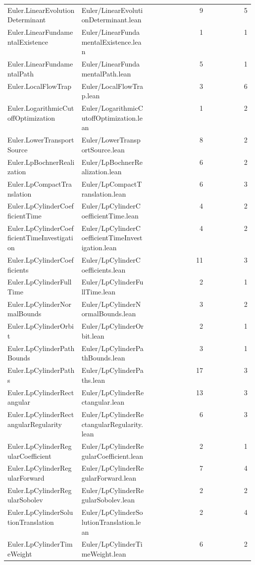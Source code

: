 \begin{longtable}{p{0.30\linewidth}p{0.28\linewidth}rr}
Euler.LinearEvolutionDeterminant & Euler/LinearEvolutionDeterminant.lean & 9 & 5\\
Euler.LinearFundamentalExistence & Euler/LinearFundamentalExistence.lean & 1 & 1\\
Euler.LinearFundamentalPath & Euler/LinearFundamentalPath.lean & 5 & 1\\
Euler.LocalFlowTrap & Euler/LocalFlowTrap.lean & 3 & 6\\
Euler.LogarithmicCutoffOptimization & Euler/LogarithmicCutoffOptimization.lean & 1 & 2\\
Euler.LowerTransportSource & Euler/LowerTransportSource.lean & 8 & 2\\
Euler.LpBochnerRealization & Euler/LpBochnerRealization.lean & 6 & 2\\
Euler.LpCompactTranslation & Euler/LpCompactTranslation.lean & 6 & 3\\
Euler.LpCylinderCoefficientTime & Euler/LpCylinderCoefficientTime.lean & 4 & 2\\
Euler.LpCylinderCoefficientTimeInvestigation & Euler/LpCylinderCoefficientTimeInvestigation.lean & 4 & 2\\
Euler.LpCylinderCoefficients & Euler/LpCylinderCoefficients.lean & 11 & 3\\
Euler.LpCylinderFullTime & Euler/LpCylinderFullTime.lean & 2 & 1\\
Euler.LpCylinderNormalBounds & Euler/LpCylinderNormalBounds.lean & 3 & 2\\
Euler.LpCylinderOrbit & Euler/LpCylinderOrbit.lean & 2 & 1\\
Euler.LpCylinderPathBounds & Euler/LpCylinderPathBounds.lean & 3 & 1\\
Euler.LpCylinderPaths & Euler/LpCylinderPaths.lean & 17 & 3\\
Euler.LpCylinderRectangular & Euler/LpCylinderRectangular.lean & 13 & 3\\
Euler.LpCylinderRectangularRegularity & Euler/LpCylinderRectangularRegularity.lean & 6 & 3\\
Euler.LpCylinderRegularCoefficient & Euler/LpCylinderRegularCoefficient.lean & 2 & 1\\
Euler.LpCylinderRegularForward & Euler/LpCylinderRegularForward.lean & 7 & 4\\
Euler.LpCylinderRegularSobolev & Euler/LpCylinderRegularSobolev.lean & 2 & 2\\
Euler.LpCylinderSolutionTranslation & Euler/LpCylinderSolutionTranslation.lean & 2 & 4\\
Euler.LpCylinderTimeWeight & Euler/LpCylinderTimeWeight.lean & 6 & 2\\

\end{longtable}
